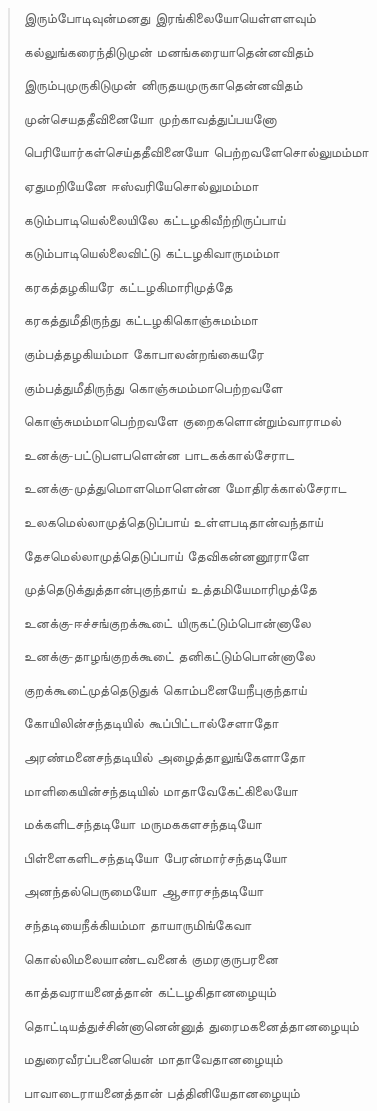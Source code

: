 \documentclass{article}
\begin{document}
\begin{quotation}
{இரும்போடிவுன்மனது இரங்கிலையோயெள்ளளவும்

கல்லுங்கரைந்திடுமுன் மனங்கரையாதென்னவிதம்

இரும்புமுருகிடுமுன் னிருதயமுருகாதென்னவிதம்

முன்செயததீவினையோ முற்காவத்துப்பயனோ

பெரியோர்கள்‌செய்ததீவினையோ பெற்றவளேசொல்‌லுமம்மா

ஏதுமறியேனே ஈஸ்வரியேசொல்லுமம்மா

கடும்பாடியெல்லையிலே கட்டழகிவீற்றிருப்பாய்

கடும்பாடியெல்லைவிட்டு கட்டழகிவாருமம்மா

கரகத்தழகியரே கட்டழகிமாரிமுத்தே

கரகத்துமீதிருந்து கட்டழகிகொஞ்சுமம்மா

கும்பத்தழகியம்மா கோபாலன்றங்கையரே

கும்பத்துமீதிருந்து கொஞ்சுமம்மாபெற்றவளே

கொஞ்சுமம்மாபெற்றவளே குறைகளொன்றும்வாராமல்

உனக்கு-பட்டுபளபளென்ன பாடகக்கால்சேராட

உனக்கு-முத்துமொளமொளென்ன மோதிரக்கால்சேராட

உலகமெல்லாமுத்தெடுப்பாய் உள்ளபடிதான்வந்தாய்

தேசமெல்லாமுத்தெடுப்பாய் தேவிகன்னனூராளே

முத்தெடுக்துத்தான்புகுந்தாய் உத்தமியேமாரிமுத்தே

உனக்கு-ஈச்சங்குறக்கூடை் யிருகட்டும்பொன்னாலே

உனக்கு-தாழங்குறக்கூடை் தனிகட்டும்பொன்னாலே

குறக்கூடை்முத்தெடுதுக் கொம்பனையேநீபுகுந்தாய்

கோயிலின்சந்தடியில் கூப்பிட்டால்சேளாதோ

அரண்மனைசந்தடியில் அழைத்தாலுங்கேளாதோ

மாளிகையின்சந்தடியில் மாதாவேகேட்கிலையோ

மக்களிடசந்தடியோ மருமககளசந்தடியோ

பிள்ளைகளிடசந்தடியோ பேரன்மார்சந்தடியோ

அனந்தல்பெருமையோ ஆசாரசந்தடியோ

சந்தடியைநீக்கியம்மா தாயாருமிங்கேவா

கொல்லிமலையாண்டவனைக் குமரகுருபரனை

காத்தவராயனைத்தான் கட்டழகிதானழையும்

தொட்டியத்துச்சின்னானென்னுத் துரைமகனைத்தானழையும்

மதுரைவீரப்பனையென் மாதாவேதானழையும்

பாவாடைராயனைத்தான் பத்தினியேதானழையும்

}
\end{quotation}
\end{document}
